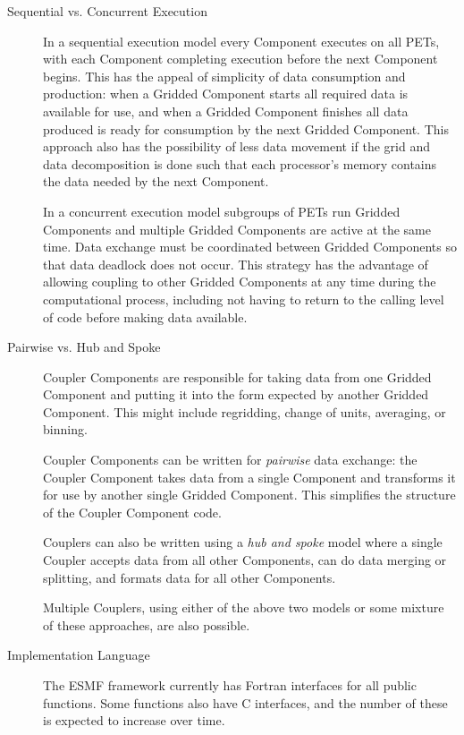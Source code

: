 \begin{description}

\item[Sequential vs. Concurrent Execution]

In a sequential execution model every Component executes
on all PETs, with each Component completing execution before
the next Component begins.  This has the appeal of 
simplicity of data consumption and production: when a Gridded 
Component starts all required data is available for use, and when 
a Gridded Component finishes all data produced is ready for consumption 
by the next Gridded Component.  This approach also has
the possibility of less data movement if the grid and
data decomposition is done such that each processor's memory contains
the data needed by the next Component.

In a concurrent execution model subgroups of PETs run
Gridded Components and multiple Gridded Components are active at the 
same time.  Data exchange must be coordinated between Gridded 
Components so that data deadlock does not occur.  This strategy 
has the advantage of allowing coupling to other Gridded Components 
at any time during the computational process, including not 
having to return to the calling level of code before making 
data available.  

\item[Pairwise vs. Hub and Spoke]

Coupler Components are responsible for taking data from one
Gridded Component and putting it into the form expected by another 
Gridded Component.  This might include regridding, change of units, 
averaging, or binning.

Coupler Components can be written for {\it pairwise} data exchange: 
the Coupler Component takes data from a single Component and transforms 
it for use by another single Gridded Component.  This simplifies the 
structure of the Coupler Component code.

Couplers can also be written using a {\it hub and spoke} model where a
single Coupler accepts data from all other Components, can do data
merging or splitting, and formats data for all other Components.

Multiple Couplers, using either of the above two models or some mixture of
these approaches, are also possible.

\item[Implementation Language]

The ESMF framework currently has Fortran interfaces for all public functions. 
Some functions also have C interfaces, and the number of these is expected to 
increase over time. 



\end{description}
